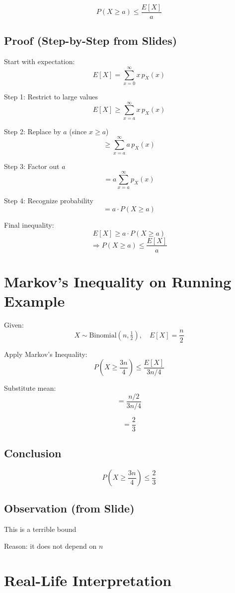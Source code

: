 \documentclass[11pt]{article}
\begin{document}
\[
P(X \geq a) \leq \frac{E[X]}{a}
\]

\subsection{Proof (Step-by-Step from Slides)}

Start with expectation:
\[
E[X] = \sum_{x=0}^{\infty} x \, p_X(x)
\]

Step 1: Restrict to large values
\[
E[X] \geq \sum_{x=a}^{\infty} x \, p_X(x)
\]

Step 2: Replace by $a$ (since $x \geq a$)
\[
\geq \sum_{x=a}^{\infty} a \, p_X(x)
\]

Step 3: Factor out $a$
\[
= a \sum_{x=a}^{\infty} p_X(x)
\]

Step 4: Recognize probability
\[
= a \cdot P(X \geq a)
\]

Final inequality:
\[
E[X] \geq a \cdot P(X \geq a)
\]
\[
\Rightarrow P(X \geq a) \leq \frac{E[X]}{a}
\]

\section{Markov’s Inequality on Running Example}

Given:
\[
X \sim \text{Binomial}(n, \tfrac{1}{2}), \quad E[X] = \frac{n}{2}
\]

Apply Markov’s Inequality:
\[
P\left(X \geq \frac{3n}{4}\right) \leq \frac{E[X]}{3n/4}
\]

Substitute mean:
\[
= \frac{n/2}{3n/4}
\]

\[
= \frac{2}{3}
\]

\subsection{Conclusion}

\[
P\left(X \geq \frac{3n}{4}\right) \leq \frac{2}{3}
\]

\subsection{Observation (from Slide)}

This is a terrible bound

Reason: it does not depend on $n$

\section{Real-Life Interpretation}
\end{document}
